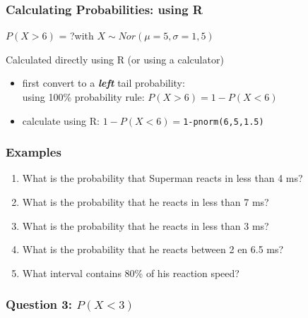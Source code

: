 \documentclass[aspectratio=169]{beamer}
\begin{document}
\begin{frame}
  \frametitle{Calculating Probabilities: using R}
  
  $P( X > 6)$ = ?\hspace{1cm}with $X \sim Nor(\mu=5,\sigma=1,5)$
  
  Calculated directly using R (or using a calculator)
  
  \begin{itemize}
    \pause
    \item first convert to a \textbf{\textit{left}} tail probability:\\
    using 100\% probability rule: $P(X>6)=1-P(X<6)$
    \item calculate using R: $1-P(X<6)=$\texttt{1-pnorm(6,5,1.5)}
  \end{itemize}
\end{frame}

\begin{frame}
  \frametitle{Examples}
  
  \begin{enumerate}
    \item What is the probability that Superman reacts in less than 4 ms?
    \item What is the probability that he reacts in less than 7 ms?
    \item What is the probability that he reacts in less than 3 ms?
    \item What is the probability that he reacts between 2 en 6.5 ms?
    \item What interval contains 80\% of his reaction speed?
  \end{enumerate}
\end{frame}

\begin{frame}
  \frametitle{Question 3: $P(X<3)$}
  
  \begin{center}
  \end{center}
\end{frame}
\end{document}
